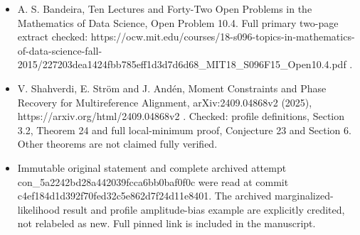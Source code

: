 \documentclass[11pt]{article}
\begin{document}
\begin{itemize}
\item
  A. S. Bandeira, Ten Lectures and Forty-Two Open Problems in the Mathematics of Data Science, Open Problem 10.4. Full primary two-page extract checked: https://ocw.mit.edu/courses/18-s096-topics-in-mathematics-of-data-science-fall-2015/227203dea1424fbb785eff1d3d7d6d68\_MIT18\_S096F15\_Open10.4.pdf .
\item
  V. Shahverdi, E. Ström and J. Andén, Moment Constraints and Phase Recovery for Multireference Alignment, arXiv:2409.04868v2 (2025), https://arxiv.org/html/2409.04868v2 . Checked: profile definitions, Section 3.2, Theorem 24 and full local-minimum proof, Conjecture 23 and Section 6. Other theorems are not claimed fully verified.
\item
  Immutable original statement and complete archived attempt con\_5a2242bd28a442039fcca6bb0baf0f0c were read at commit c4ef184d1d392f70fed32c5e862d7f24d11e8401. The archived marginalized-likelihood result and profile amplitude-bias example are explicitly credited, not relabeled as new. Full pinned link is included in the manuscript.
\end{itemize}
\end{document}
